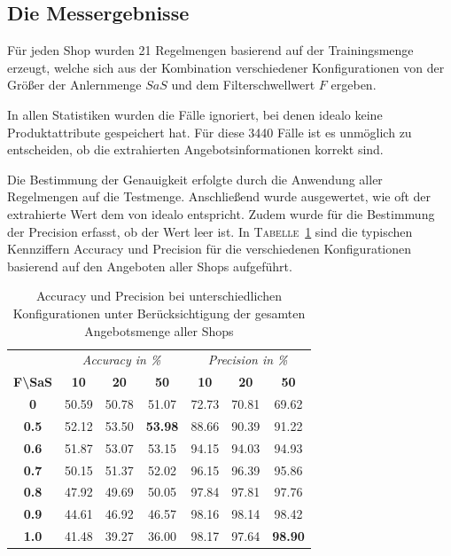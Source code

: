 \subsection{Die Messergebnisse}
\label{subsec:genauigkeitsmessung}

Für jeden Shop wurden 21 Regelmengen basierend auf der Trainingsmenge erzeugt, welche sich aus der Kombination
verschiedener Konfigurationen von der Größer der Anlernmenge $SaS$ und dem Filterschwellwert $F$ ergeben.

In allen Statistiken wurden die Fälle ignoriert, bei denen idealo keine Produktattribute gespeichert hat.
Für diese 3440 Fälle ist es unmöglich zu entscheiden, ob die extrahierten Angebotsinformationen korrekt sind.

Die Bestimmung der Genauigkeit erfolgte durch die Anwendung aller Regelmengen auf die Testmenge.
Anschließend wurde ausgewertet, wie oft der extrahierte Wert dem von idealo entspricht.
Zudem wurde für die Bestimmung der Precision erfasst, ob der Wert leer ist.
In \textsc{Tabelle}~\ref{tab:accuracy-precision} sind die typischen Kennziffern Accuracy und Precision für die
verschiedenen Konfigurationen basierend auf den Angeboten aller Shops aufgeführt.

\begin{table}[h]
    \centering
    \begin{tabular}{ c | c c c | c c c }
        &   \multicolumn{3}{c}{\textit{Accuracy in \%}}    &   \multicolumn{3}{c}{\textit{Precision in \%}} \\
        \textbf{F\textbackslash SaS} & \textbf{10} & \textbf{20} & \textbf{50} & \textbf{10} & \textbf{20} & \textbf{50}  \\
        \hline
        \textbf{0}       &   50.59 &   50.78 &   51.07         &   72.73 &   70.81 &   69.62 \\
        \textbf{0.5}     &   52.12 &   53.50 &   \textbf{53.98}&   88.66 &   90.39 &   91.22 \\
        \textbf{0.6}     &   51.87 &   53.07 &   53.15         &   94.15 &   94.03 &   94.93 \\
        \textbf{0.7}     &   50.15 &   51.37 &   52.02         &   96.15 &   96.39 &   95.86 \\
        \textbf{0.8}     &   47.92 &   49.69 &   50.05         &   97.84 &   97.81 &   97.76 \\
        \textbf{0.9}     &   44.61 &   46.92 &   46.57         &   98.16 &   98.14 &   98.42 \\
        \textbf{1.0}     &   41.48 &   39.27 &   36.00         &   98.17 &   97.64 &   \textbf{98.90}

    \end{tabular}
    \caption{Accuracy und Precision bei unterschiedlichen Konfigurationen unter Berücksichtigung der gesamten
    Angebotsmenge aller Shops}
    \label{tab:accuracy-precision}
    \vspace{-0.5cm}
\end{table}

